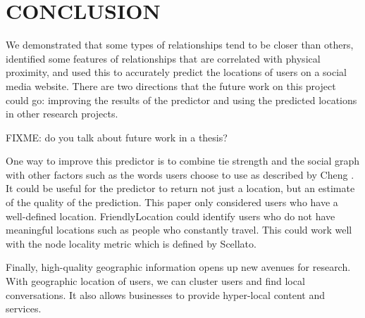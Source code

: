 \chapter{\uppercase{Conclusion}}
We demonstrated that some types of relationships tend to be closer than others,
identified some features of relationships that are correlated with physical
proximity, and used this to accurately predict the locations of users on a
social media website.
There are two directions that the future work on this project could go:
improving the results of the predictor and using the predicted locations in
other research projects.

FIXME: do you talk about future work in a thesis?

One way to improve this predictor is to combine tie strength and the social
graph with other factors such as the words users choose to use as described by
Cheng \cite{cheng2010you}.
It could be useful for the predictor to return not just a location, but an
estimate of the quality of the prediction.  This paper only considered
users who have a well-defined location. FriendlyLocation could identify users
who do not have meaningful locations such as people who constantly travel.
This could work well with the node locality metric which is defined by
Scellato\cite{scellato2010distance}.

Finally, high-quality geographic information opens up new avenues for research.
With geographic location of users, we can cluster users and find local
conversations.
It also allows businesses to provide hyper-local content and services.


